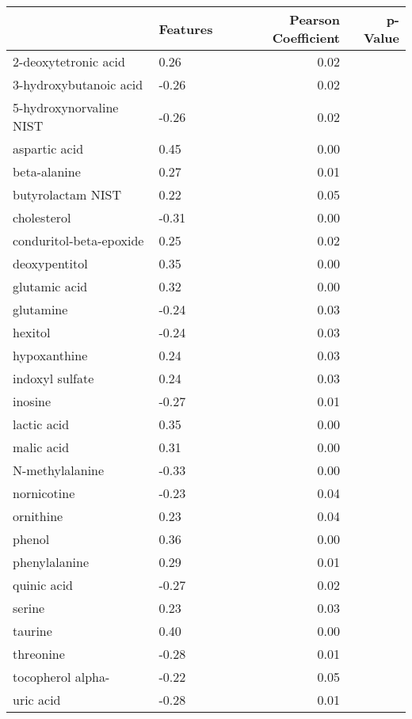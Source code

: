 \begin{tabular}{llrr}
\toprule
{} &                 Features &  Pearson Coefficient &  p-Value \\
\midrule
2-deoxytetronic acid &                 0.26 &     0.02 \\
3-hydroxybutanoic acid &                -0.26 &     0.02 \\
5-hydroxynorvaline NIST &                -0.26 &     0.02 \\
aspartic acid &                 0.45 &     0.00 \\
beta-alanine &                 0.27 &     0.01 \\
butyrolactam NIST &                 0.22 &     0.05 \\
cholesterol &                -0.31 &     0.00 \\
conduritol-beta-epoxide &                 0.25 &     0.02 \\
deoxypentitol &                 0.35 &     0.00 \\
glutamic acid &                 0.32 &     0.00 \\
glutamine &                -0.24 &     0.03 \\
hexitol &                -0.24 &     0.03 \\
hypoxanthine &                 0.24 &     0.03 \\
indoxyl sulfate &                 0.24 &     0.03 \\
inosine &                -0.27 &     0.01 \\
lactic acid &                 0.35 &     0.00 \\
malic acid &                 0.31 &     0.00 \\
N-methylalanine &                -0.33 &     0.00 \\
nornicotine &                -0.23 &     0.04 \\
ornithine &                 0.23 &     0.04 \\
phenol &                 0.36 &     0.00 \\
phenylalanine &                 0.29 &     0.01 \\
quinic acid &                -0.27 &     0.02 \\
serine &                 0.23 &     0.03 \\
taurine &                 0.40 &     0.00 \\
threonine &                -0.28 &     0.01 \\
tocopherol alpha- &                -0.22 &     0.05 \\
uric acid &                -0.28 &     0.01 \\
\bottomrule
\end{tabular}
